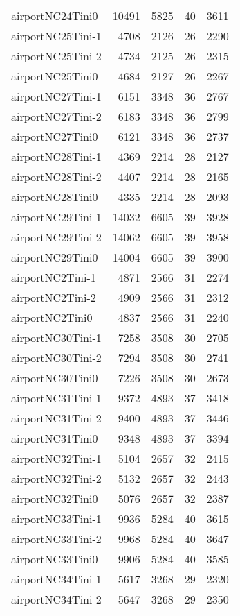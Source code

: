 \begin{longtable}{lrrrr}
airportNC24Tini0 & 10491 & 5825 & 40 & 3611 \\
airportNC25Tini-1 & 4708 & 2126 & 26 & 2290 \\
airportNC25Tini-2 & 4734 & 2125 & 26 & 2315 \\
airportNC25Tini0 & 4684 & 2127 & 26 & 2267 \\
airportNC27Tini-1 & 6151 & 3348 & 36 & 2767 \\
airportNC27Tini-2 & 6183 & 3348 & 36 & 2799 \\
airportNC27Tini0 & 6121 & 3348 & 36 & 2737 \\
airportNC28Tini-1 & 4369 & 2214 & 28 & 2127 \\
airportNC28Tini-2 & 4407 & 2214 & 28 & 2165 \\
airportNC28Tini0 & 4335 & 2214 & 28 & 2093 \\
airportNC29Tini-1 & 14032 & 6605 & 39 & 3928 \\
airportNC29Tini-2 & 14062 & 6605 & 39 & 3958 \\
airportNC29Tini0 & 14004 & 6605 & 39 & 3900 \\
airportNC2Tini-1 & 4871 & 2566 & 31 & 2274 \\
airportNC2Tini-2 & 4909 & 2566 & 31 & 2312 \\
airportNC2Tini0 & 4837 & 2566 & 31 & 2240 \\
airportNC30Tini-1 & 7258 & 3508 & 30 & 2705 \\
airportNC30Tini-2 & 7294 & 3508 & 30 & 2741 \\
airportNC30Tini0 & 7226 & 3508 & 30 & 2673 \\
airportNC31Tini-1 & 9372 & 4893 & 37 & 3418 \\
airportNC31Tini-2 & 9400 & 4893 & 37 & 3446 \\
airportNC31Tini0 & 9348 & 4893 & 37 & 3394 \\
airportNC32Tini-1 & 5104 & 2657 & 32 & 2415 \\
airportNC32Tini-2 & 5132 & 2657 & 32 & 2443 \\
airportNC32Tini0 & 5076 & 2657 & 32 & 2387 \\
airportNC33Tini-1 & 9936 & 5284 & 40 & 3615 \\
airportNC33Tini-2 & 9968 & 5284 & 40 & 3647 \\
airportNC33Tini0 & 9906 & 5284 & 40 & 3585 \\
airportNC34Tini-1 & 5617 & 3268 & 29 & 2320 \\
airportNC34Tini-2 & 5647 & 3268 & 29 & 2350 \\

\end{longtable}
